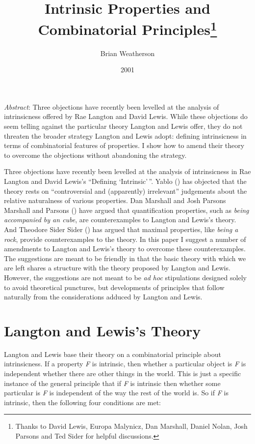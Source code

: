 \documentclass[
  11pt,
  letterpaper,
  DIV=11,
  numbers=noendperiod,
  twoside]{scrartcl}
\title{Intrinsic Properties and Combinatorial Principles\thanks{Thanks
to David Lewis, Europa Malynicz, Dan Marshall, Daniel Nolan, Josh
Parsons and Ted Sider for helpful discussions.}}
\author{Brian Weatherson}
\date{2001}
\renewenvironment{abstract}
 {\vspace{-1.25cm}
 \quotation\small\noindent\emph{Abstract}:}
 {\endquotation}
\renewenvironment{abstract}
 {\quotation\small\noindent\emph{Abstract}:}
 {\endquotation\vspace{-0.02cm}}
\begin{document}
\maketitle
\begin{abstract}
Three objections have recently been levelled at the analysis of
intrinsicness offered by Rae Langton and David Lewis. While these
objections do seem telling against the particular theory Langton and
Lewis offer, they do not threaten the broader strategy Langton and Lewis
adopt: defining intrinsicness in terms of combinatorial features of
properties. I show how to amend their theory to overcome the objections
without abandoning the strategy.
\end{abstract}


Three objections have recently been levelled at the analysis of
intrinsicness in Rae Langton and David Lewis's ``Defining
`Intrinsic'\,''. Yablo () has objected
that the theory rests on ``controversial and (apparently) irrelevant''
judgements about the relative naturalness of various properties. Dan
Marshall and Josh Parsons Marshall and Parsons
() have argued that quantification
properties, such as \emph{being accompanied by an cube}, are
counterexamples to Langton and Lewis's theory. And Theodore Sider Sider
() has argued that maximal properties,
like \emph{being a rock}, provide counterexamples to the theory. In this
paper I suggest a number of amendments to Langton and Lewis's theory to
overcome these counterexamples. The suggestions are meant to be friendly
in that the basic theory with which we are left shares a structure with
the theory proposed by Langton and Lewis. However, the suggestions are
not meant to be \emph{ad hoc} stipulations designed solely to avoid
theoretical punctures, but developments of principles that follow
naturally from the considerations adduced by Langton and Lewis.

\section{Langton and Lewis's Theory}\label{langton-and-lewiss-theory}

Langton and Lewis base their theory on a combinatorial principle about
intrinsicness. If a property \emph{F} is intrinsic, then whether a
particular object is \emph{F} is independent whether there are other
things in the world. This is just a specific instance of the general
principle that if \emph{F} is intrinsic then whether some particular is
\emph{F} is independent of the way the rest of the world is. So if
\emph{F} is intrinsic, then the following four conditions are met:
\end{document}
